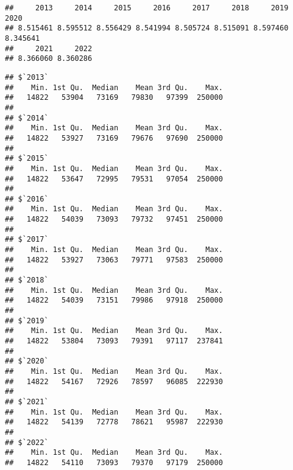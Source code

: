\documentclass[
]{article}
\newenvironment{Shaded}{\begin{snugshade}}{\end{snugshade}}
\newcommand{\AttributeTok}[1]{\textcolor[rgb]{0.13,0.29,0.53}{#1}}
\newcommand{\ConstantTok}[1]{\textcolor[rgb]{0.56,0.35,0.01}{#1}}
\newcommand{\FunctionTok}[1]{\textcolor[rgb]{0.13,0.29,0.53}{\textbf{#1}}}
\newcommand{\NormalTok}[1]{#1}
\newcommand{\SpecialCharTok}[1]{\textcolor[rgb]{0.81,0.36,0.00}{\textbf{#1}}}
\begin{document}
\begin{Shaded}
\end{Shaded}

\begin{verbatim}
##     2013     2014     2015     2016     2017     2018     2019     2020 
## 8.515461 8.595512 8.556429 8.541994 8.505724 8.515091 8.597460 8.345641 
##     2021     2022 
## 8.366060 8.360286
\end{verbatim}

\begin{Shaded}
\end{Shaded}

\begin{verbatim}
## $`2013`
##    Min. 1st Qu.  Median    Mean 3rd Qu.    Max. 
##   14822   53904   73169   79830   97399  250000 
## 
## $`2014`
##    Min. 1st Qu.  Median    Mean 3rd Qu.    Max. 
##   14822   53927   73169   79676   97690  250000 
## 
## $`2015`
##    Min. 1st Qu.  Median    Mean 3rd Qu.    Max. 
##   14822   53647   72995   79531   97054  250000 
## 
## $`2016`
##    Min. 1st Qu.  Median    Mean 3rd Qu.    Max. 
##   14822   54039   73093   79732   97451  250000 
## 
## $`2017`
##    Min. 1st Qu.  Median    Mean 3rd Qu.    Max. 
##   14822   53927   73063   79771   97583  250000 
## 
## $`2018`
##    Min. 1st Qu.  Median    Mean 3rd Qu.    Max. 
##   14822   54039   73151   79986   97918  250000 
## 
## $`2019`
##    Min. 1st Qu.  Median    Mean 3rd Qu.    Max. 
##   14822   53804   73093   79391   97117  237841 
## 
## $`2020`
##    Min. 1st Qu.  Median    Mean 3rd Qu.    Max. 
##   14822   54167   72926   78597   96085  222930 
## 
## $`2021`
##    Min. 1st Qu.  Median    Mean 3rd Qu.    Max. 
##   14822   54139   72778   78621   95987  222930 
## 
## $`2022`
##    Min. 1st Qu.  Median    Mean 3rd Qu.    Max. 
##   14822   54110   73093   79370   97179  250000
\end{verbatim}
\end{document}
